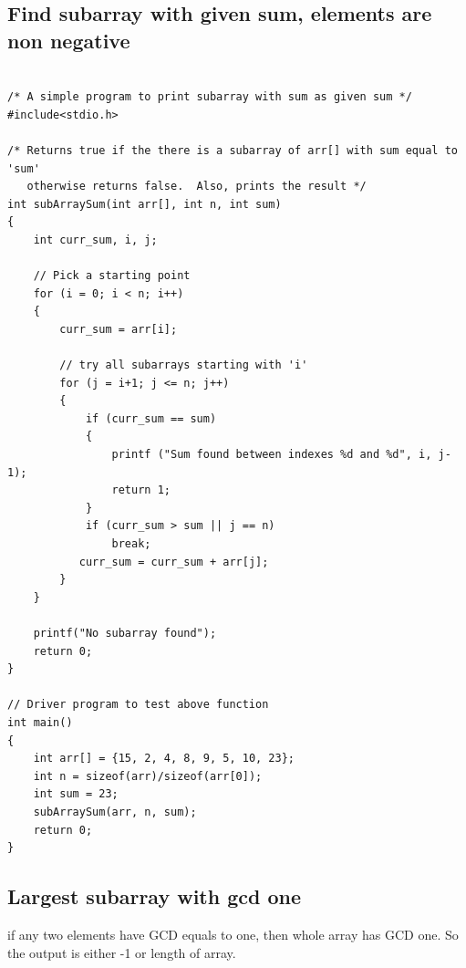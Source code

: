 \documentclass[8pt, a4paper, oneside, twocolumn]{extarticle}
\begin{document}
\subsection{Find subarray with given sum, elements are non negative}
\begin{verbatim}

/* A simple program to print subarray with sum as given sum */
#include<stdio.h> 
  
/* Returns true if the there is a subarray of arr[] with sum equal to 'sum' 
   otherwise returns false.  Also, prints the result */
int subArraySum(int arr[], int n, int sum) 
{ 
    int curr_sum, i, j; 
  
    // Pick a starting point 
    for (i = 0; i < n; i++) 
    { 
        curr_sum = arr[i]; 
  
        // try all subarrays starting with 'i' 
        for (j = i+1; j <= n; j++) 
        { 
            if (curr_sum == sum) 
            { 
                printf ("Sum found between indexes %d and %d", i, j-1); 
                return 1; 
            } 
            if (curr_sum > sum || j == n) 
                break; 
           curr_sum = curr_sum + arr[j]; 
        } 
    } 
  
    printf("No subarray found"); 
    return 0; 
} 
  
// Driver program to test above function 
int main() 
{ 
    int arr[] = {15, 2, 4, 8, 9, 5, 10, 23}; 
    int n = sizeof(arr)/sizeof(arr[0]); 
    int sum = 23; 
    subArraySum(arr, n, sum); 
    return 0; 
} 

\end{verbatim}
\subsection{Largest subarray with gcd one}
if any two elements have GCD equals to one, then whole array has GCD one. So the output is either -1 or length of array.
\end{document}
